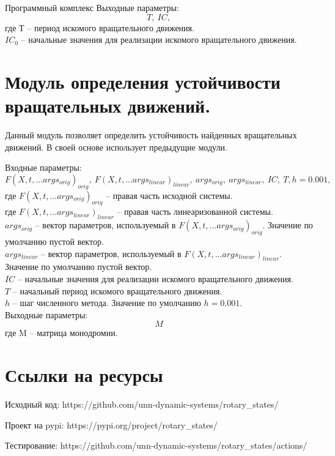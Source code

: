 \begin{chapter}{Программный комплекс}
Выходные параметры: $$T,  \ IC,$$
где $\text{Т}$ -- период искомого вращательного движения. \\
$IC_0$ -- начальные значения для реализации искомого вращательного движения. \\


\section{Модуль определения устойчивости вращательных движений.}
Данный модуль позволяет определить устойчивость найденных вращательных движений.
В своей основе использует предыдущие модули.

Входные параметры: $$F(X, t, ...args_{orig})_{orig}, \ F(X, t, ...args_{linear})_{linear}, \ args_{orig}, \ args_{linear}, \ IC, \ T , h=0.001,$$
где $F(X, t, ...args_{orig})_{orig}$ -- правая часть исходной системы. \\
где $F(X, t, ...args_{linear})_{linear}$ -- правая часть линеаризованной  системы. \\
$args_{orig}$ -- вектор параметров, используемый в $F(X, t, ...args_{orig})_{orig}$. Значение по умолчанию пустой вектор. \\ 
$args_{linear}$ -- вектор параметров, используемый в $F(X, t, ...args_{linear})_{linear}$. Значение по умолчанию пустой вектор. \\
$IC$ -- начальные значения для реализации искомого вращательного движения.\\
$T$ -- начальный период искомого вращательного движения.\\
$h$ -- шаг численного метода. Значение по умолчанию $h = 0.001$. \\

Выходные параметры: $$M$$
где $\text{M}$ -- матрица монодромии.

\section{Ссылки на ресурсы}
Исходный код: https://github.com/unn-dynamic-systems/rotary\_states/

Проект на pypi: https://pypi.org/project/rotary\_states/

Тестирование: https://github.com/unn-dynamic-systems/rotary\_states/actions/

\end{chapter}
